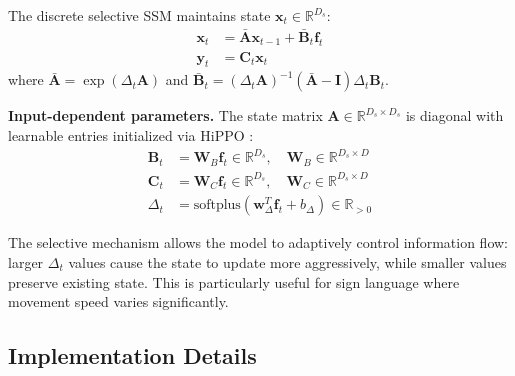 \documentclass{article}
\theoremstyle{definition}
\theoremstyle{remark}
\begin{document}
The discrete selective SSM maintains state $\mathbf{x}_t \in \mathbb{R}^{D_s}$:
\begin{align}
\mathbf{x}_t &= \bar{\mathbf{A}} \mathbf{x}_{t-1} + \bar{\mathbf{B}}_t \mathbf{f}_t \\
\mathbf{y}_t &= \mathbf{C}_t \mathbf{x}_t
\end{align}
where $\bar{\mathbf{A}} = \exp(\Delta_t \mathbf{A})$ and $\bar{\mathbf{B}}_t = (\Delta_t \mathbf{A})^{-1}(\bar{\mathbf{A}} - \mathbf{I})\Delta_t \mathbf{B}_t$.

\textbf{Input-dependent parameters.} The state matrix $\mathbf{A} \in \mathbb{R}^{D_s \times D_s}$ is diagonal with learnable entries initialized via HiPPO \citep{gu2022efficiently}:
\begin{align}
\mathbf{B}_t &= \mathbf{W}_B \mathbf{f}_t \in \mathbb{R}^{D_s}, \quad \mathbf{W}_B \in \mathbb{R}^{D_s \times D} \\
\mathbf{C}_t &= \mathbf{W}_C \mathbf{f}_t \in \mathbb{R}^{D_s}, \quad \mathbf{W}_C \in \mathbb{R}^{D_s \times D} \\
\Delta_t &= \text{softplus}(\mathbf{w}_\Delta^T \mathbf{f}_t + b_\Delta) \in \mathbb{R}_{>0}
\end{align}

The selective mechanism allows the model to adaptively control information flow: larger $\Delta_t$ values cause the state to update more aggressively, while smaller values preserve existing state. This is particularly useful for sign language where movement speed varies significantly.

\subsection{Implementation Details}
\end{document}
